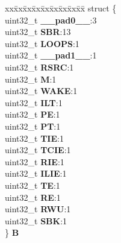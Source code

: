 \begin{DoxyCompactItemize}
\begin{tabbing}
\end{tabbing}\item 
\mbox{\label{unionESCI__tag_1_1ESCI__CR1__tag_add7d3a3658c16586444cbfa63433f9c7}} 
\begin{tabbing}
xx\=xx\=xx\=xx\=xx\=xx\=xx\=xx\=xx\=\kill
struct \{\\
\>uint32\_t {\bfseries \_\_pad0\_\_}:3\\
\>uint32\_t {\bfseries SBR}:13\\
\>uint32\_t {\bfseries LOOPS}:1\\
\>uint32\_t {\bfseries \_\_pad1\_\_}:1\\
\>uint32\_t {\bfseries RSRC}:1\\
\>uint32\_t {\bfseries M}:1\\
\>uint32\_t {\bfseries WAKE}:1\\
\>uint32\_t {\bfseries ILT}:1\\
\>uint32\_t {\bfseries PE}:1\\
\>uint32\_t {\bfseries PT}:1\\
\>uint32\_t {\bfseries TIE}:1\\
\>uint32\_t {\bfseries TCIE}:1\\
\>uint32\_t {\bfseries RIE}:1\\
\>uint32\_t {\bfseries ILIE}:1\\
\>uint32\_t {\bfseries TE}:1\\
\>uint32\_t {\bfseries RE}:1\\
\>uint32\_t {\bfseries RWU}:1\\
\>uint32\_t {\bfseries SBK}:1\\
\} {\bfseries B}\\


\end{tabbing}
\end{DoxyCompactItemize}
